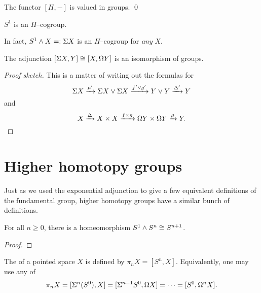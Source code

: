 \begin{corollary}
The functor $[H, -]$ is valued in groups. \qed
\end{corollary}

\begin{example}
$S^1$ is an $H$--cogroup.
\end{example}

\begin{example}
In fact, $S^1 \wedge X =: \Sigma X$ is an $H$--cogroup for \emph{any} $X$.
\end{example}

\begin{lemma}
The adjunction $[\Sigma X, Y] \cong [X, \Omega Y]$ is an isomorphism of groups.
\end{lemma}
\begin{proof}[Proof sketch]
This is a matter of writing out the formulas for \[\Sigma X \xrightarrow{\mu'} \Sigma X \vee \Sigma X \xrightarrow{f' \vee g'} Y \vee Y \xrightarrow{\Delta'} Y\] and \[X \xrightarrow\Delta X \times X \xrightarrow{f \times g} \Omega Y \times \Omega Y \xrightarrow\mu Y. \qedhere\]
\end{proof}




\section{Higher homotopy groups}

Just as we used the exponential adjunction to give a few equivalent definitions of the fundamental group, higher homotopy groups have a similar bunch of definitions.

\begin{lemma}
For all $n \ge 0$, there is a homeomorphism $S^1 \wedge S^n \cong S^{n+1}$.
\end{lemma}
\begin{proof}
\end{proof}

\begin{definition}
The  of a pointed space $X$ is defined by $\pi_n X = [S^n, X]$.
Equivalently, one may use any of \[\pi_n X = [\Sigma^n(S^0), X] = [\Sigma^{n-1} S^0, \Omega X] = \cdots = [S^0, \Omega^n X].\]
\end{definition}

